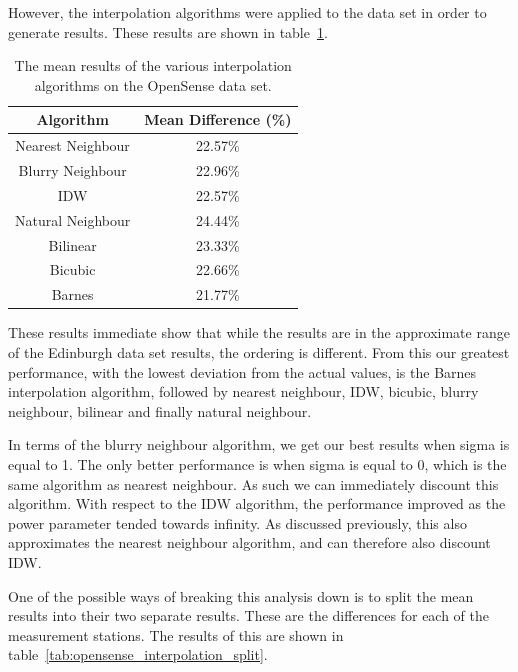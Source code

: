 
			However, the interpolation algorithms were applied to the data set in order to generate results. These results are shown in table~\ref{tab:opensense_interpolation_results}.

			\begin{table}
				\centering
	    		\begin{tabular}{|c|c|}
	    			\hline
					Algorithm & Mean Difference (\%) \\ \hline
					Nearest Neighbour & 22.57\% \\
					Blurry Neighbour & 22.96\% \\
					IDW & 22.57\% \\
					Natural Neighbour & 24.44\% \\
					Bilinear & 23.33\% \\
					Bicubic & 22.66\% \\
					Barnes & 21.77\% \\
					\hline
				\end{tabular}
				\caption{The mean results of the various interpolation algorithms on the OpenSense data set.}
				\label{tab:opensense_interpolation_results}
			\end{table} 

			These results immediate show that while the results are in the approximate range of the Edinburgh data set results, the ordering is different. From this our greatest performance, with the lowest deviation from the actual values, is the Barnes interpolation algorithm, followed by nearest neighbour, IDW, bicubic, blurry neighbour, bilinear and finally natural neighbour. 

			In terms of the blurry neighbour algorithm, we get our best results when sigma is equal to 1. The only better performance is when sigma is equal to 0, which is the same algorithm as nearest neighbour. As such we can immediately discount this algorithm. With respect to the IDW algorithm, the performance improved as the power parameter tended towards infinity. As discussed previously, this also approximates the nearest neighbour algorithm, and can therefore also discount IDW.

			One of the possible ways of breaking this analysis down is to split the mean results into their two separate results. These are the differences for each of the measurement stations. The results of this are shown in table~\ref{tab:opensense_interpolation_split}.

